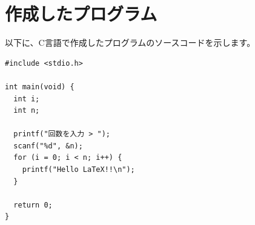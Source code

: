 \documentclass{ltjsarticle}
\begin{document}
\section{作成したプログラム}
以下に、C言語で作成したプログラムのソースコードを示します。
\begin{verbatim}
#include <stdio.h>

int main(void) {
  int i;
  int n;

  printf("回数を入力 > ");
  scanf("%d", &n);
  for (i = 0; i < n; i++) {
    printf("Hello LaTeX!!\n");
  }

  return 0;
}
\end{verbatim}
\end{document}
